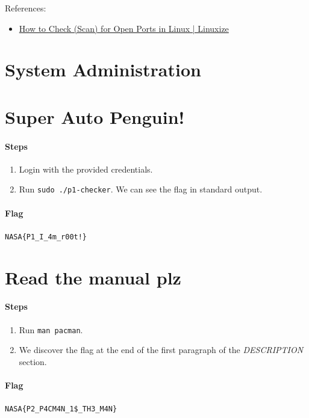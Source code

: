 \documentclass[12pt, a4paper]{article}
\begin{document}
\begin{enumerate}
\begin{enumerate}
        References:
        \begin{itemize}
          \item \href{https://linuxize.com/post/check-open-ports-linux/}{How to Check (Scan) for Open Ports in Linux | Linuxize}
        \end{itemize}
    \end{enumerate}
  \end{enumerate}

  \clearpage
  \section*{System Administration}
  \setcounter{section}{0}
  \section{Super Auto Penguin!}
  \paragraph{Steps}
  \begin{enumerate}
    \item Login with the provided credentials.
    \item Run \verb|sudo ./p1-checker|. We can see the flag in standard output.
  \end{enumerate}
  \paragraph{Flag} \verb|NASA{P1_I_4m_r00t!}|

  \section{Read the manual plz}
  \paragraph{Steps}
  \begin{enumerate}
    \item Run \verb|man pacman|.
    \item We discover the flag at the end of the first paragraph of the
      \textit{DESCRIPTION} section.
  \end{enumerate}
  \paragraph{Flag} \verb|NASA{P2_P4CM4N_1$_TH3_M4N}|
\end{document}
